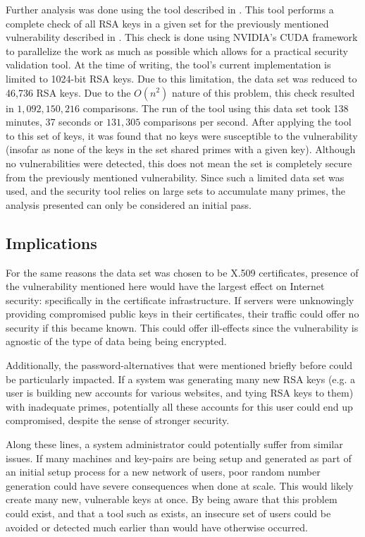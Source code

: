 \documentclass[12pt]{ucthesis}
\begin{document}
Further analysis was done using the tool described in
\cite{scharfglass2012breaking}. This tool performs a complete check of all
RSA keys in a given set for the previously mentioned vulnerability described
in \cite{lenstra2012ron}. This check is done using NVIDIA's CUDA framework to
parallelize the work as much as possible which allows for a practical security
validation tool. At the time of writing, the tool's current implementation is
limited to 1024-bit RSA keys. Due to this limitation, the data set was
reduced to 46,736 RSA keys. Due to the $O(n^2)$ nature of this problem,
this check resulted in $1,092,150,216$ comparisons. The run of the tool using
this data set took 138 minutes, 37 seconds or $131,305$ comparisons per second.
After applying the tool to this set of keys, it was found that no keys were
susceptible to the vulnerability (insofar as none of the keys in the set
shared primes with a given key). Although no vulnerabilities were detected,
this does not mean the set is completely secure from the previously mentioned
vulnerability. Since such a limited data set was used, and the security tool
relies on large sets to accumulate many primes, the analysis presented can
only be considered an initial pass.

\subsection{Implications}
\label{subsec:implications}
For the same reasons the data set was chosen to be X.509 certificates, presence
of the vulnerability mentioned here would have the largest effect on Internet
security: specifically in the certificate infrastructure. If servers were
unknowingly providing compromised public keys in their certificates, their
traffic could offer no security if this became known. This could offer
ill-effects since the vulnerability is agnostic of the type of data being
being encrypted.

Additionally, the password-alternatives that were mentioned briefly before
could be particularly impacted. If a system was generating many new RSA keys
(e.g. a user is building new accounts for various websites, and tying RSA keys
to them) with inadequate primes, potentially all these accounts for this user
could end up compromised, despite the sense of stronger security.

Along these lines, a system administrator could potentially suffer from similar
issues. If many machines and key-pairs are being setup and generated as part of
an initial setup process for a new network of users, poor random number
generation could have severe consequences when done at scale. This would likely
create many new, vulnerable keys at once. By being aware that this problem
could exist, and that a tool such as \cite{scharfglass2012breaking} exists, an
insecure set of users could be avoided or detected much earlier than would have
otherwise occurred.
\end{document}
